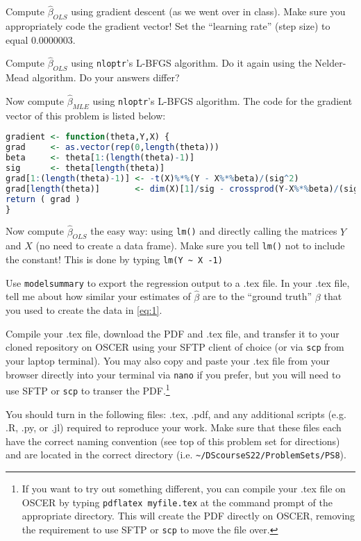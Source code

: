 \documentclass[12pt,english]{exam}
\begin{document}
\begin{questions}
\question Compute $\hat{\beta}_{OLS}$ using gradient descent (as we went over in class). Make sure you appropriately code the gradient vector! Set the ``learning rate'' (step size) to equal 0.0000003.

\question Compute $\hat{\beta}_{OLS}$ using \texttt{nloptr}'s L-BFGS algorithm. Do it again using the Nelder-Mead algorithm. Do your answers differ?

\question Now compute $\hat{\beta}_{MLE}$ using \texttt{nloptr}'s L-BFGS algorithm. The code for the gradient vector of this problem is listed below:
\begin{lstlisting}[language=R]
gradient <- function(theta,Y,X) {
grad     <- as.vector(rep(0,length(theta)))
beta     <- theta[1:(length(theta)-1)]
sig      <- theta[length(theta)]
grad[1:(length(theta)-1)] <- -t(X)%*%(Y - X%*%beta)/(sig^2)
grad[length(theta)]       <- dim(X)[1]/sig - crossprod(Y-X%*%beta)/(sig^3)
return ( grad )
}
\end{lstlisting}

\question Now compute $\hat{\beta}_{OLS}$ the easy way: using \texttt{lm()} and directly calling the matrices $Y$ and $X$ (no need to create a data frame). Make sure you tell \texttt{lm()} not to include the constant! This is done by typing \texttt{lm(Y \textasciitilde{} X -1)}

Use \texttt{modelsummary} to export the regression output to a .tex file. In your .tex file, tell me about how similar your estimates of $\hat{\beta}$ are to the ``ground truth'' $\beta$ that you used to create the data in \eqref{eq:1}.

\question Compile your .tex file, download the PDF and .tex file, and transfer it to your cloned repository on OSCER using your SFTP client of choice (or via \texttt{scp} from your laptop terminal). You may also copy and paste your .tex file from your browser directly into your terminal via \texttt{nano} if you prefer, but you will need to use SFTP or \texttt{scp} to transer the PDF.\footnote{If you want to try out something different, you can compile your .tex file on OSCER by typing \texttt{pdflatex myfile.tex} at the command prompt of the appropriate directory. This will create the PDF directly on OSCER, removing the requirement to use SFTP or \texttt{scp} to move the file over.}

\question You should turn in the following files: .tex, .pdf, and any additional scripts (e.g. .R, .py, or .jl) required to reproduce your work.  Make sure that these files each have the correct naming convention (see top of this problem set for directions) and are located in the correct directory (i.e. \texttt{\textasciitilde/DScourseS22/ProblemSets/PS8}).


\end{questions}
\end{document}

